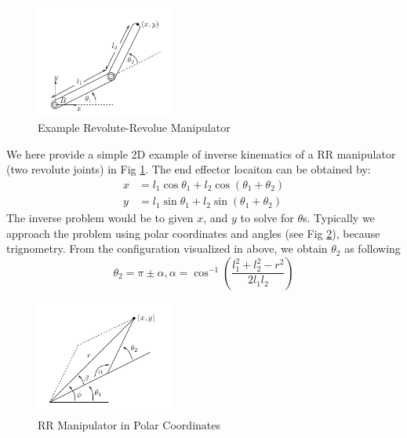 \documentclass[letterpaper]{article}
\begin{document}
\begin{figure}
  \centering
  \includegraphics[width=0.4\textwidth]{figs/ik-1.png}
  \caption{Example Revolute-Revolue Manipulator} \label{fig:rrik-1}
\end{figure}

We here provide a simple 2D example of inverse kinematics of a RR manipulator (two revolute joints)
in Fig \ref{fig:rrik-1}.
The end effector locaiton can be obtained by:
\begin{equation*}
  \begin{split}
    x & = l_1\cos\theta_1 + l_2\cos(\theta_1 + \theta_2)\\
    y & = l_1\sin\theta_1 + l_2\sin(\theta_1 + \theta_2)
  \end{split}
\end{equation*}
The inverse problem would be to given $x$, and $y$ to solve for $\theta$s. 
Typically we approach the problem using polar coordinates and angles (see Fig \ref{fig:rrik-2}), because
trignometry. From the configuration visualized in above, we obtain $\theta_2$ as following
\begin{equation*}
  \theta_2 = \pi \pm \alpha, \alpha = \cos^{-1}\left(\frac{l_1^2+l_2^2-r^2}{2l_1l_2}\right)
\end{equation*}

\begin{figure}
  \centering
  \includegraphics[width=0.4\textwidth]{figs/ik-2.png}
  \caption{RR Manipulator in Polar Coordinates} \label{fig:rrik-2}
\end{figure}
\end{document}
